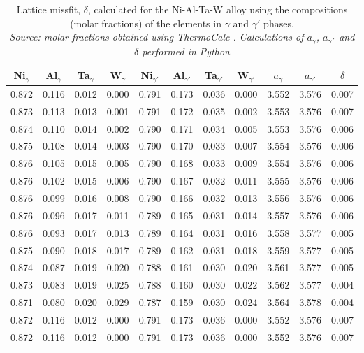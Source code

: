 \begin{table}[H]
    \centering
    \begin{tabular}{rrrrrrrrrrr}
        \multicolumn{1}{c}{Ni$_\gamma$} & \multicolumn{1}{c}{Al$_\gamma$} & \multicolumn{1}{c}{Ta$_\gamma$} & \multicolumn{1}{c}{W$_\gamma$} & \multicolumn{1}{c}{Ni$_{\gamma'}$} & \multicolumn{1}{c}{Al$_{\gamma'}$} & \multicolumn{1}{c}{Ta$_{\gamma'}$} & \multicolumn{1}{c}{W$_{\gamma'}$} & \multicolumn{1}{c}{$a_\gamma$} & \multicolumn{1}{c}{$a_{\gamma'}$} & \multicolumn{1}{c}{$\delta$} \\ \hline \hline
        0.872 & 0.116 & 0.012 & 0.000 & 0.791 & 0.173 & 0.036 & 0.000 & 3.552 & 3.576 & 0.007 \\0.873 & 0.113 & 0.013 & 0.001 & 0.791 & 0.172 & 0.035 & 0.002 & 3.553 & 3.576 & 0.007 \\0.874 & 0.110 & 0.014 & 0.002 & 0.790 & 0.171 & 0.034 & 0.005 & 3.553 & 3.576 & 0.006 \\0.875 & 0.108 & 0.014 & 0.003 & 0.790 & 0.170 & 0.033 & 0.007 & 3.554 & 3.576 & 0.006 \\0.876 & 0.105 & 0.015 & 0.005 & 0.790 & 0.168 & 0.033 & 0.009 & 3.554 & 3.576 & 0.006 \\0.876 & 0.102 & 0.015 & 0.006 & 0.790 & 0.167 & 0.032 & 0.011 & 3.555 & 3.576 & 0.006 \\0.876 & 0.099 & 0.016 & 0.008 & 0.790 & 0.166 & 0.032 & 0.013 & 3.556 & 3.576 & 0.006 \\0.876 & 0.096 & 0.017 & 0.011 & 0.789 & 0.165 & 0.031 & 0.014 & 3.557 & 3.576 & 0.006 \\0.876 & 0.093 & 0.017 & 0.013 & 0.789 & 0.164 & 0.031 & 0.016 & 3.558 & 3.577 & 0.005 \\0.875 & 0.090 & 0.018 & 0.017 & 0.789 & 0.162 & 0.031 & 0.018 & 3.559 & 3.577 & 0.005 \\0.874 & 0.087 & 0.019 & 0.020 & 0.788 & 0.161 & 0.030 & 0.020 & 3.561 & 3.577 & 0.005 \\0.873 & 0.083 & 0.019 & 0.025 & 0.788 & 0.160 & 0.030 & 0.022 & 3.562 & 3.577 & 0.004 \\0.871 & 0.080 & 0.020 & 0.029 & 0.787 & 0.159 & 0.030 & 0.024 & 3.564 & 3.578 & 0.004 \\0.872 & 0.116 & 0.012 & 0.000 & 0.791 & 0.173 & 0.036 & 0.000 & 3.552 & 3.576 & 0.007 \\0.872 & 0.116 & 0.012 & 0.000 & 0.791 & 0.173 & 0.036 & 0.000 & 3.552 & 3.576 & 0.007
    \end{tabular}
    \caption{\centering Lattice missfit, $\delta$, calculated for the Ni-Al-Ta-W alloy using the compositions (molar fractions) of the elements in $\gamma$ and $\gamma'$ phases. \\
    \textit{Source: molar fractions obtained using ThermoCalc \citep{thermocalc}. Calculations of $a_\gamma$, $a_{\gamma´}$ and $\delta$ performed in Python \citep{mygit}}}
    \label{tab:tab11}
\end{table}

